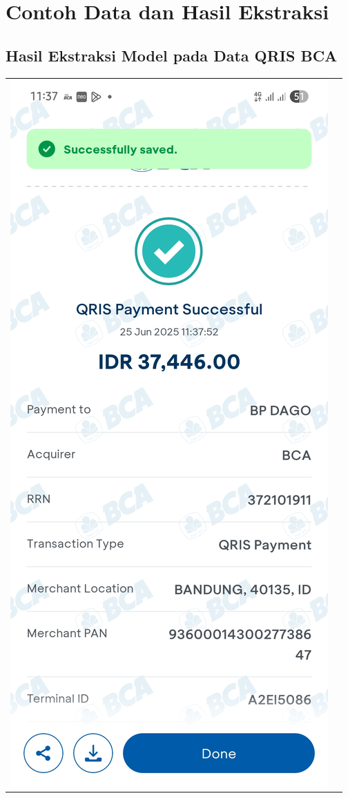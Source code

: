 \chapter{Contoh Data dan Hasil Ekstraksi}
\label{chapter:contoh-data}

\section{Hasil Ekstraksi Model pada Data QRIS BCA}

\begin{table}[h!]
    \centering
    \begin{tabularx}{\textwidth}{m{} X}
        \includegraphics[width=\linewidth]{images/contoh-data/qris-1.jpg}

\end{tabularx}
\end{table}
